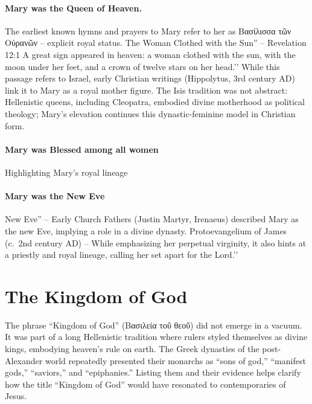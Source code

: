 \paragraph{Mary was the Queen of Heaven.}\label{par:mary-was-the-queen-of-heaven.}
The earliest known hymns and prayers to Mary refer to her as Βασίλισσα τῶν Οὐρανῶν – explicit royal status.
The Woman Clothed with the Sun'' -- Revelation 12:1 A great sign appeared in heaven: a woman clothed with the sun, with the moon under her feet, and a crown of twelve stars on her head.’’ While this passage refers to Israel, early Christian writings (Hippolytus, 3rd century AD) link it to Mary as a royal mother figure. The Isis tradition was not abstract: Hellenistic queens, including Cleopatra, embodied divine motherhood as political theology; Mary’s elevation continues this dynastic-feminine model in Christian form.
\paragraph{Mary was Blessed among all women}\label{par:mary-was-blessed-among-all-women}
Highlighting Mary’s royal lineage
\paragraph{Mary was the New Eve}\label{par:mary-was-the-new-eve}
New Eve'' -- Early Church Fathers (Justin Martyr, Irenaeus) described Mary as the new Eve, implying a role in a divine dynasty.
Protoevangelium of James (c.~2nd century AD) -- While emphasizing her perpetual virginity, it also hints at a priestly and royal lineage, calling her set apart for the Lord.’’

\section{The Kingdom of God}\label{sec:the-kingdom-of-god}
The phrase “Kingdom of God” (\textgreek{Βασιλεία τοῦ θεοῦ}) did not emerge in a vacuum.
It was part of a long Hellenistic tradition where rulers styled themselves as divine kings, embodying heaven’s rule on earth.
The Greek dynasties of the post-Alexander world repeatedly presented their monarchs as “sons of god,” “manifest gods,” “saviors,” and “epiphanies.”
Listing them and their evidence helps clarify how the title “Kingdom of God” would have resonated to contemporaries of Jesus.

